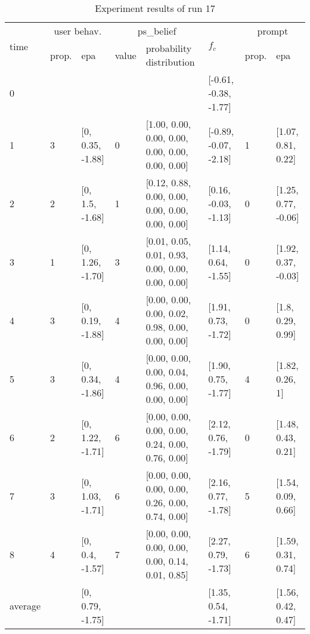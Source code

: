 \begin{table}[htbp]\footnotesize
\caption{Experiment results of run 17}
\begin{tabular}{|p{0.4cm}|p{0.6cm}|l|p{0.6cm}|p{3.3cm}|l|p{0.6cm}|l|}
\hline

\multirow{2}{*}{time} & \multicolumn{2}{c|}{user behav.} & \multicolumn{2}{c|}{ps\_belief} &
\multirow{2}{*}{$f_c$} & \multicolumn{2}{c|}{prompt} \\ \cline{2-5}\cline{ 7- 8}
& prop. & epa & value & probability distribution &  & prop. & epa \\ \hline

0 & \multicolumn{1}{l|}{} &  & \multicolumn{1}{l|}{} &  & [-0.61, -0.38, -1.77] & \multicolumn{1}{l|}{} &  \\ \hline
1 & 3 & [0, 0.35, -1.88] & 0 & [1.00, 0.00, 0.00, 0.00, 0.00, 0.00, 0.00, 0.00] & [-0.89, -0.07, -2.18] & 1 & [1.07, 0.81, 0.22] \\ \hline
2 & 2 & [0, 1.5, -1.68] & 1 & [0.12, 0.88, 0.00, 0.00, 0.00, 0.00, 0.00, 0.00] & [0.16, -0.03, -1.13] & 0 & [1.25, 0.77, -0.06] \\ \hline
3 & 1 & [0, 1.26, -1.70] & 3 & [0.01, 0.05, 0.01, 0.93, 0.00, 0.00, 0.00, 0.00] & [1.14, 0.64, -1.55] & 0 & [1.92, 0.37, -0.03] \\ \hline
4 & 3 & [0, 0.19, -1.88] & 4 & [0.00, 0.00, 0.00, 0.02, 0.98, 0.00, 0.00, 0.00] & [1.91, 0.73, -1.72] & 0 & [1.8, 0.29, 0.99] \\ \hline
5 & 3 & [0, 0.34, -1.86] & 4 & [0.00, 0.00, 0.00, 0.04, 0.96, 0.00, 0.00, 0.00] & [1.90, 0.75, -1.77] & 4 & [1.82, 0.26, 1] \\ \hline
6 & 2 & [0, 1.22, -1.71] & 6 & [0.00, 0.00, 0.00, 0.00, 0.24, 0.00, 0.76, 0.00] & [2.12, 0.76, -1.79] & 0 & [1.48, 0.43, 0.21] \\ \hline
7 & 3 & [0, 1.03, -1.71] & 6 & [0.00, 0.00, 0.00, 0.00, 0.26, 0.00, 0.74, 0.00] & [2.16, 0.77, -1.78] & 5 & [1.54, 0.09, 0.66] \\ \hline
8 & 4 & [0, 0.4, -1.57] & 7 & [0.00, 0.00, 0.00, 0.00, 0.00, 0.14, 0.01, 0.85] & [2.27, 0.79, -1.73] & 6 & [1.59, 0.31, 0.74] \\ \hline
\multicolumn{1}{|l|}{average} & \multicolumn{1}{l|}{} & [0, 0.79, -1.75] & \multicolumn{1}{l|}{} &  & [1.35, 0.54, -1.71] & \multicolumn{1}{l|}{} & [1.56, 0.42, 0.47] \\ \hline
\end{tabular}
\label{}
\end{table}



